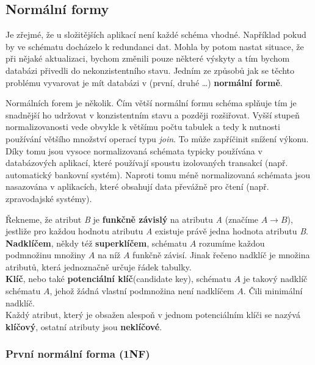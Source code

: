 \subsection{Normální formy}

Je zřejmé, že u složitějších aplikací není každé schéma vhodné. Například pokud
by ve schématu docházelo k redundanci dat. Mohla by potom nastat situace, že při
nějaké aktualizaci, bychom změnili pouze některé výskyty a tím bychom databázi
přivedli do nekonzistentního stavu. Jedním ze způsobů jak se těchto problému
vyvarovat je mít databázi v (první, druhé \dots) \textbf{normální formě}.

Normálních forem je několik. Čím větší normální formu schéma splňuje tím je
snadnější ho udržovat v konzistentním stavu a později rozšiřovat. Vyšší stupeň
normalizovanosti vede obvykle k většímu počtu tabulek a tedy k nutnosti
používání většího množství operací typu \emph{join}. To může zapříčinit snížení
výkonu. Díky tomu jsou vysoce normalizovaná schémata typicky používána v
databázových aplikací, které používají spoustu izolovaných transakcí (např.
automatický bankovní systém). Naproti tomu méně normalizovaná schémata jsou
nasazována v aplikacích, které obsahují data převážně pro čtení (např.
zpravodajské systémy).

\begin{definice}
Řekneme, že atribut \emph{B} je \textbf{funkčně závislý} na atributu \emph{A}
(značíme $A\rightarrow B$), jestliže pro každou hodnotu atributu \emph{A}
existuje právě jedna hodnota atributu \emph{B}.\\[5mm]
\textbf{Nadklíčem}, někdy též \textbf{superklíčem}, schématu $A$ rozumíme každou
podmnožinu množiny $A$ na níž $A$ funkčně závisí. Jinak řečeno nadklíč je množina
atributů, která jednoznačně určuje řádek tabulky.\\[5mm]
\textbf{Klíč}, nebo také \textbf{potenciální klíč}(candidate key), schématu $A$
je takový nadklíč schématu $A$, jehož žádná vlastní podmnožina není nadklíčem
$A$. Čili minimální nadklíč.\\[5mm]
Každý atribut, který je obsažen alespoň v jednom potenciálním klíči se nazývá
\textbf{klíčový}, ostatní atributy jsou \textbf{neklíčové}.
\end{definice}

\subsubsection*{První normální forma (1NF)}

